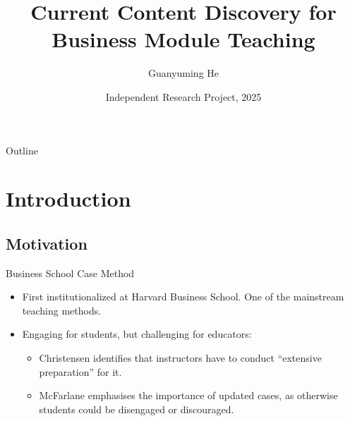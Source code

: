 \documentclass{beamer}
\title
{Current Content Discovery for Business Module Teaching}
\author
{Guanyuming He}
\institute[Imperial College London]
{
  Department of Earth Science and Engineering\\
  Imperial College London
}
\date[IRP 25]
{Independent Research Project, 2025}
\begin{document}
\begin{frame}
  \titlepage
\end{frame}

\begin{frame}{Outline}
  \tableofcontents
\end{frame}





\section{Introduction}

\subsection{Motivation}

\begin{frame}{Business School Case Method}

  \begin{itemize}
  \item
    First institutionalized at Harvard Business School. One of the mainstream
	teaching methods.
  \item
	Engaging for students, but challenging for educators:
	\begin{itemize}
	\item
		Christensen identifies that instructors have to conduct ``extensive
		preparation'' for it.
	\item
		McFarlane emphasises the importance of updated cases, as otherwise
		students could be disengaged or discouraged.
	\end{itemize}
  \end{itemize}
\end{frame}
\end{document}
